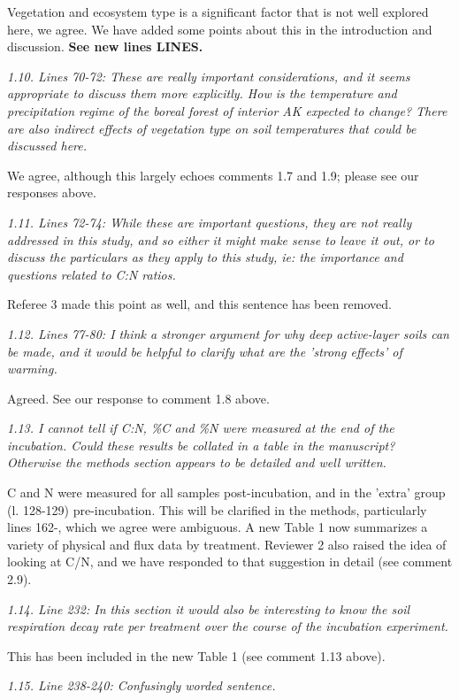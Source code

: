 \documentclass[11pt, oneside]{article}
\begin{document}
Vegetation and ecosystem type is a significant factor that is not well explored here, we agree. We have added some points about this in the introduction and discussion. {\bf See new lines LINES.}

\medskip
{\it 1.10. Lines 70-72: These are really important considerations, and it seems appropriate to discuss them more explicitly. How is the temperature and precipitation regime of the boreal forest of interior AK expected to change? There are also indirect effects of vegetation type on soil temperatures that could be discussed here. }

We agree, although this largely echoes comments 1.7 and 1.9; please see our responses above.

\medskip
{\it 1.11. Lines 72-74: While these are important questions, they are not really addressed in this study, and so either it might make sense to leave it out, or to discuss the particulars as they apply to this study, ie: the importance and questions related to C:N ratios. }

Referee 3 made this point as well, and this sentence has been removed.

\medskip
{\it 1.12. Lines 77-80: I think a stronger argument for why deep active-layer soils can be made, and it would be helpful to clarify what are the 'strong effects' of warming. }

Agreed. See our response to comment 1.8 above.

\medskip
{\it 1.13. I cannot tell if C:N, \%C and \%N were measured at the end of the incubation. Could these results be collated in a table in the manuscript? Otherwise the methods section appears to be detailed and well written. }

C and N were measured for all samples post-incubation, and in the 'extra' group (l. 128-129) pre-incubation. This will be clarified in the methods, particularly lines 162-, which we agree were ambiguous. A new Table 1 now summarizes a variety of physical and flux data by treatment. Reviewer 2 also raised the idea of looking at C/N, and we have responded to that suggestion in detail (see comment 2.9).

\medskip
{\it 1.14. Line 232: In this section it would also be interesting to know the soil respiration decay rate per treatment over the course of the incubation experiment. }

This has been included in the new Table 1 (see comment 1.13 above).

\medskip
{\it 1.15. Line 238-240: Confusingly worded sentence. }
\end{document}
